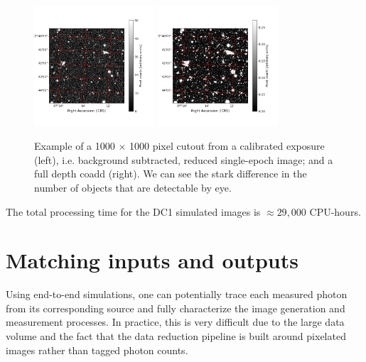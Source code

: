 \documentclass[\docopts]{\docclass}
\begin{document}
\begin{figure}
\centering
\includegraphics[width=0.4\textwidth]{calexp_example.png}
\includegraphics[width=0.4\textwidth]{coadd_example.png}
\caption{Example of a 1000 $\times$ 1000 pixel cutout from a calibrated exposure (left), i.e. background subtracted, reduced single-epoch image; and a full depth coadd (right). We can see the stark difference in the number of objects that are detectable by eye.}
\label{fig:coadd_example}
\end{figure}

The total processing time for the DC1 simulated images is $\approx 29,000$ CPU-hours.

\section{Matching inputs and outputs}
\label{sec:matching}

Using end-to-end simulations, one can potentially trace each measured photon from its corresponding source and fully characterize the image generation and measurement processes. In practice, this is very difficult due to the large data volume and the fact that the data reduction pipeline is built around pixelated images rather than tagged photon counts.
\end{document}
